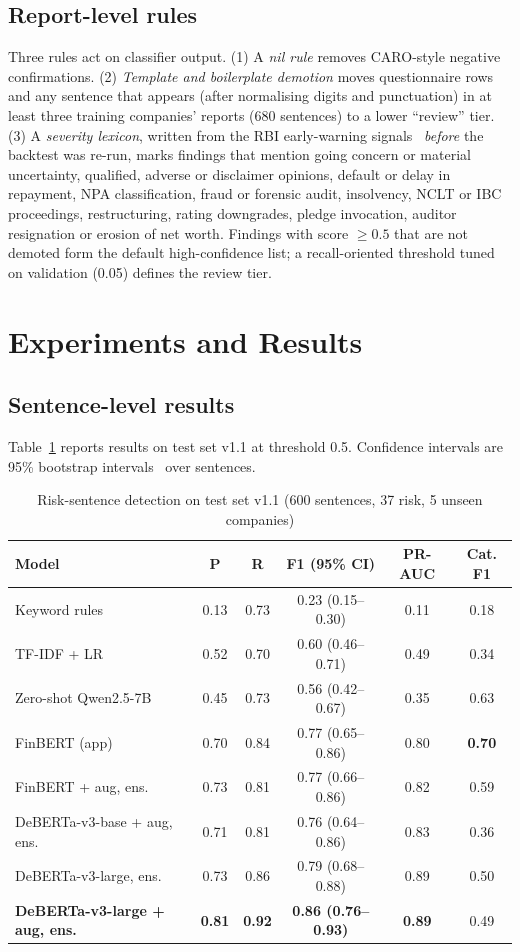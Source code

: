 \documentclass[conference]{IEEEtran}
\begin{document}
\subsection{Report-level rules}
Three rules act on classifier output. (1) A \emph{nil rule} removes CARO-style negative confirmations. (2) \emph{Template and boilerplate demotion} moves questionnaire rows and any sentence that appears (after normalising digits and punctuation) in at least three training companies' reports (680 sentences) to a lower ``review'' tier. (3) A \emph{severity lexicon}, written from the RBI early-warning signals~\cite{rbi2015ews} \emph{before} the backtest was re-run, marks findings that mention going concern or material uncertainty, qualified, adverse or disclaimer opinions, default or delay in repayment, NPA classification, fraud or forensic audit, insolvency, NCLT or IBC proceedings, restructuring, rating downgrades, pledge invocation, auditor resignation or erosion of net worth. Findings with score $\ge 0.5$ that are not demoted form the default high-confidence list; a recall-oriented threshold tuned on validation (0.05) defines the review tier.

\section{Experiments and Results}
\subsection{Sentence-level results}
Table~\ref{tab:main} reports results on test set v1.1 at threshold 0.5. Confidence intervals are 95\% bootstrap intervals~\cite{efron1993} over sentences.

\begin{table}[t]
\caption{Risk-sentence detection on test set v1.1 (600 sentences, 37 risk, 5 unseen companies)}
\label{tab:main}
\centering
\setlength{\tabcolsep}{8pt}
\begin{tabular}{@{}lccccc@{}}
\toprule
Model & P & R & F1 (95\% CI) & PR-AUC & Cat. F1 \\
\midrule
Keyword rules & 0.13 & 0.73 & 0.23 (0.15--0.30) & 0.11 & 0.18 \\
TF-IDF + LR & 0.52 & 0.70 & 0.60 (0.46--0.71) & 0.49 & 0.34 \\
Zero-shot Qwen2.5-7B & 0.45 & 0.73 & 0.56 (0.42--0.67) & 0.35 & 0.63 \\
FinBERT (app) & 0.70 & 0.84 & 0.77 (0.65--0.86) & 0.80 & \textbf{0.70} \\
FinBERT + aug, ens. & 0.73 & 0.81 & 0.77 (0.66--0.86) & 0.82 & 0.59 \\
DeBERTa-v3-base + aug, ens. & 0.71 & 0.81 & 0.76 (0.64--0.86) & 0.83 & 0.36 \\
DeBERTa-v3-large, ens. & 0.73 & 0.86 & 0.79 (0.68--0.88) & 0.89 & 0.50 \\
\textbf{DeBERTa-v3-large + aug, ens.} & \textbf{0.81} & \textbf{0.92} & \textbf{0.86 (0.76--0.93)} & \textbf{0.89} & 0.49 \\
\bottomrule
\end{tabular}
\end{table}
\end{document}
